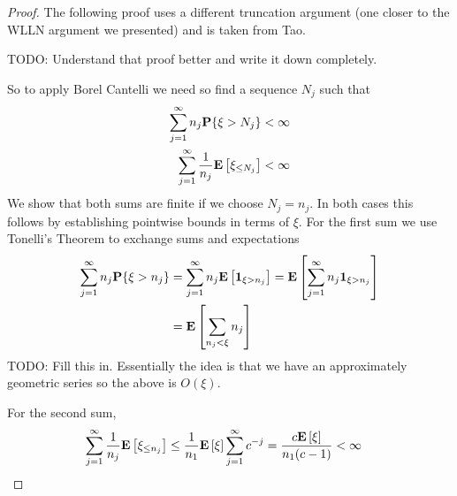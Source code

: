 \begin{proof}The following proof uses a different truncation argument
  (one closer to the WLLN argument we presented) and is
  taken from Tao.

TODO:  Understand that proof better and write it down completely.

So to apply Borel Cantelli we need so find a sequence $N_j$ such that 
\begin{align*}
\sum_{j=1}^\infty n_j \textbf{P}\{\xi > N_j\} &< \infty \\
\sum_{j=1}^\infty \frac{1}{n_j} \textbf{E}\left[\xi_{\leq N_j}\right] &< \infty 
\end{align*}
We show that both sums are finite if we choose $N_j = n_j$.  In both
cases this follows by establishing pointwise bounds in terms of
$\xi$.  For the first sum we use Tonelli's Theorem to exchange sums
and expectations
\begin{align*}
\sum_{j=1}^\infty n_j \textbf{P}\{\xi > n_j\} &= \sum_{j=1}^\infty n_j
\textbf{E}\left[\textbf{1}_{\xi > n_j}\right]= 
\textbf{E}\left[\sum_{j=1}^\infty n_j\textbf{1}_{\xi > n_j}\right] \\
&=\textbf{E}\left[\sum_{n_j < \xi}  n_j\right] 
\end{align*}
TODO: Fill this in.  Essentially the idea is that we have an
approximately geometric series so the above is $O(\xi)$.

For the second sum, 
\begin{align*}
\sum_{j=1}^\infty \frac{1}{n_j} \textbf{E}\left[\xi_{\leq n_j}\right] &\leq
\frac{1}{n_1} \textbf{E}\left[\xi\right] \sum_{j=1}^\infty c^{-j} =
\frac{c  \textbf{E}\left[\xi\right]}{n_1(c-1)} < \infty
\end{align*}
\end{proof}

